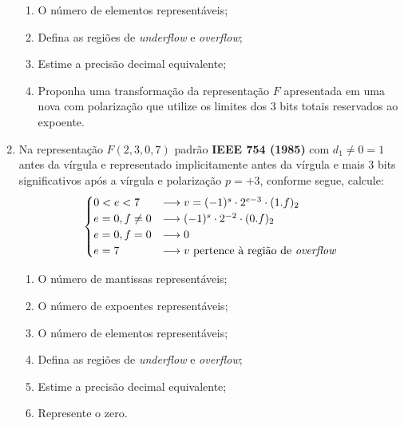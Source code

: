 \documentclass[12pt]{article}
\newenvironment{smallitem}{
    \vspace{-2mm}
    \begin{enumerate}
    \setlength{\parskip}{0pt}
    \setlength{\itemsep}{2pt}
}{
    \vspace{-2mm}
    \end{enumerate}
}
\begin{document}
\begin{enumerate}[label=\textbf{\arabic*})]
\begin{smallitem}
\item O número de elementos representáveis;

\item Defina as regiões de \textit{underflow} e \textit{overflow};

\item Estime a precisão decimal equivalente;

\item Proponha uma transformação da representação $F$ apresentada em uma nova
com polarização que utilize os limites dos 3 bits totais reservados ao expoente.

\end{smallitem}

\item Na representação $F(2, 3, 0, 7)$ padrão \textbf{IEEE 754 (1985)} com $d_1
\neq 0 = 1$ antes da vírgula e representado implicitamente antes da vírgula e
mais 3 bits significativos após a vírgula e  polarização $p = +3$, conforme
segue, calcule:
\begin{align*}
\begin{cases}
0 < e < 7 & \longrightarrow v = (-1)^s \cdot 2^{e-3} \cdot (1.f)_2 \\
e = 0, f \neq 0 & \longrightarrow (-1)^s \cdot 2^{-2} \cdot (0.f)_2 \\
e = 0, f = 0 & \longrightarrow 0 \\
e = 7 & \longrightarrow v \text{ pertence à região de \textit{overflow}}
\end{cases}
\end{align*}

\begin{smallitem}

\item O número de mantissas representáveis;

\item O número de expoentes representáveis;

\item O número de elementos representáveis;

\item Defina as regiões de \textit{underflow} e \textit{overflow};

\item Estime a precisão decimal equivalente;

\item Represente o zero.

\end{smallitem}


\end{enumerate}
\end{document}
